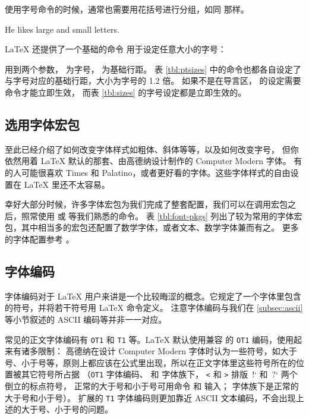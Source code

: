 使用字号命令的时候，通常也需要用花括号进行分组，如同  那样。
\begin{example}
He likes {\LARGE large and
{\small small} letters}.
\end{example}

\LaTeX{} 还提供了一个基础的命令  用于设定任意大小的字号：
\begin{command}
\end{command}

 用到两个参数， 为字号， 为基础行距。
表 \ref{tbl:ptsizes} 中的命令也都各自设定了与字号对应的基础行距，大小为字号的 1.2 倍。
如果不是在导言区， 的设定需要  命令才能立即生效，
而表 \ref{tbl:sizes} 的字号设定都是立即生效的。

\subsection{选用字体宏包}\label{subsec:font-pkgs}

至此已经介绍了如何改变字体样式如粗体、斜体等等，以及如何改变字号，
但你依然用着 \LaTeX{} 默认的那套、由高德纳设计制作的 Computer Modern 字体。
有的人可能很喜欢 Times 和 Palatino，或者更好看的字体。这些字体样式的自由设置在 \LaTeX{} 里还不太容易。

幸好大部分时候，许多字体宏包为我们完成了整套配置，我们可以在调用宏包之后，照常使用  或  等我们熟悉的命令。
表 \ref{tbl:font-pkgs} 列出了较为常用的字体宏包，其中相当多的宏包还配置了数学字体，或者文本、数学字体兼而有之。
更多的字体配置参考 \cite{survey,fontcatalogue}。

\subsection{字体编码}\label{subsec:font-encs}

字体编码对于 \LaTeX{} 用户来讲是一个比较晦涩的概念。它规定了一个字体里包含的符号，并将若干符号用 \LaTeX{} 命令定义。
注意字体编码与我们在 \ref{subsec:ascii} 等小节叙述的 ASCII 编码等并非一一对应。

常见的正文字体编码有 \texttt{OT1} 和 \texttt{T1} 等。\LaTeX{} 默认使用兼容  的 \texttt{OT1} 编码，使用起来有诸多限制：
高德纳在设计 Computer Modern 字体时认为一些符号，如大于号、小于号等，原则上都应该在公式里出现，所以在正文字体里这些符号所在的位置被其它符号所占据
（\texttt{OT1} 字体编码、 和  字体族下， \texttt< 和 \texttt> 排版\ !` 和\ ?` 两个倒立的标点符号，
正常的大于号和小于号可用命令  和  输入； 字体族下是正常的大于号和小于号）。
扩展的 \texttt{T1} 字体编码则更加靠近 ASCII 文本编码，不会出现上述的大于号、小于号的问题。


